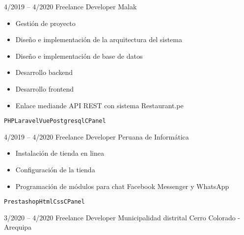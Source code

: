 
\begin{entrylist}
    \entry
		{4/2019 -- 4/2020}
		{Freelance Developer}
		{Malak}
		{
		    \vspace{-5mm}
    	    \begin{itemize}
    	        \setlength\itemsep{0pt}
    	        \setlength\parskip{0pt}
    	        \item Gestión de proyecto
    	        \item Diseño e implementación de la arquitectura del sistema
    	        \item Diseño e implementación de base de datos
    	        \item Desarrollo backend
    	        \item Desarrollo frontend
    	        \item Enlace mediande API REST con sistema Restaurant.pe
    	    \end{itemize}\texttt{PHP}\slashsep\texttt{Laravel}\slashsep\texttt{Vue}\slashsep\texttt{Postgresql}\slashsep\texttt{CPanel}
        }
	\entry
		{4/2019 -- 4/2020}
		{Freelance Developer}
		{Peruana de Informática}
		{
		    \vspace{-5mm}
    	    \begin{itemize}
    	        \setlength\itemsep{0pt}
    	        \setlength\parskip{0pt}
    	        \item Instalación de tienda en linea
    	        \item Configuración de la tienda
    	        \item Programación de módulos para chat Facebook Messenger y WhatsApp
    	    \end{itemize}
		    \texttt{Prestashop}\slashsep\texttt{Html}\slashsep\texttt{Css}\slashsep\texttt{CPanel}
        }
	\entry
		{3/2020 -- 4/2020}
		{Freelance Developer}
		{Municipalidad distrital Cerro Colorado - Arequipa}
		{
		    \vspace{-5mm}
    	    \begin{itemize}
    	        \setlength\itemsep{0pt}
    	        \setlength\parskip{0pt}

\end{itemize}}
\end{entrylist}
